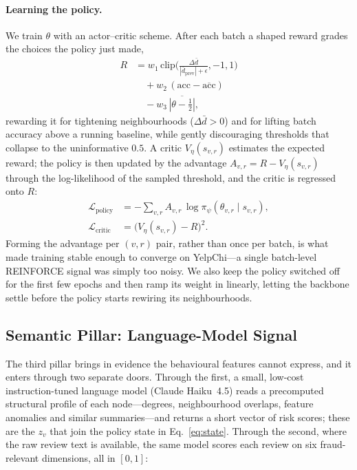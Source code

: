 \documentclass{conf}
\begin{document}
\paragraph{Learning the policy.} We train $\theta$ with an actor--critic scheme.
After each batch a shaped reward grades the choices the policy just made,
\begin{equation}
\label{eq:reward}
\begin{aligned}
R &= w_1\,\mathrm{clip}\!\Big(\tfrac{\Delta \bar d}{|\bar d_{\text{prev}}|+\epsilon},-1,1\Big)\\
  &\quad + w_2\,(\mathrm{acc}-\overline{\mathrm{acc}})\\
  &\quad - w_3\,\overline{|\theta-\tfrac12|},
\end{aligned}
\end{equation}
rewarding it for tightening neighbourhoods ($\Delta\bar d>0$) and for lifting
batch accuracy above a running baseline, while gently discouraging thresholds
that collapse to the uninformative $0.5$. A critic $V_\eta(s_{v,r})$ estimates
the expected reward; the policy is then updated by the advantage
$A_{v,r}=R-V_\eta(s_{v,r})$ through the log-likelihood of the sampled threshold,
and the critic is regressed onto $R$:
\begin{equation}
\label{eq:ac}
\begin{aligned}
\mathcal{L}_{\text{policy}} &= -\!\!\sum_{v,r} A_{v,r}\,\log \pi_\psi(\theta_{v,r}\mid s_{v,r}),\\
\mathcal{L}_{\text{critic}} &= \big(V_\eta(s_{v,r})-R\big)^2 .
\end{aligned}
\end{equation}
Forming the advantage per $(v,r)$ pair, rather than once per batch, is what made
training stable enough to converge on YelpChi---a single batch-level REINFORCE
signal was simply too noisy. We also keep the policy switched off for the first
few epochs and then ramp its weight in linearly, letting the backbone settle
before the policy starts rewiring its neighbourhoods.

\subsection{Semantic Pillar: Language-Model Signal}
\label{sec:method-llm}

The third pillar brings in evidence the behavioural features cannot express, and
it enters through two separate doors. Through the first, a small, low-cost
instruction-tuned language model (Claude Haiku~4.5) reads a precomputed
structural profile of each node---degrees, neighbourhood overlaps, feature
anomalies and similar summaries---and returns a short vector of risk scores;
these are the $z_v$ that join the policy state in Eq.~\eqref{eq:state}. Through
the second, where the raw review text is available, the same model scores each
review on six fraud-relevant dimensions, all in $[0,1]$:
\end{document}
